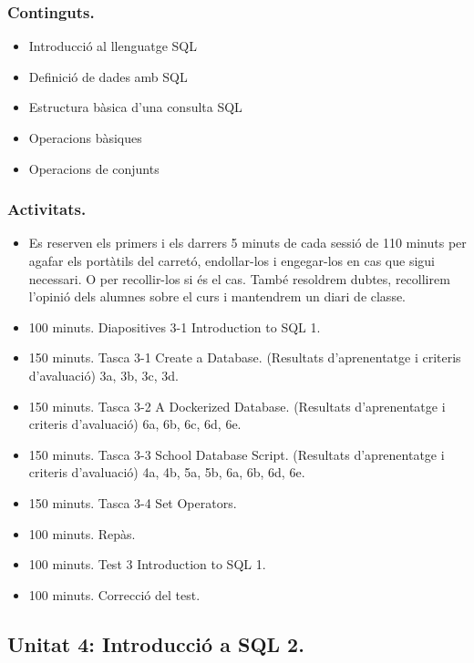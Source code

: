 \documentclass[catalan, a4paper, 12pt, titlepage]{article}
\begin{document}
  \subsubsection{Continguts.}
  \begin{itemize}
	  \item Introducció al llenguatge SQL
	  \item Definició de dades amb SQL
	  \item Estructura bàsica d'una consulta SQL
	  \item Operacions bàsiques
	  \item Operacions de conjunts
  \end{itemize}

  \subsubsection{Activitats.}

  \begin{itemize}
          \item Es reserven els primers i els darrers 5 minuts de cada sessió de 110 minuts per agafar els portàtils del carretó, endollar-los i engegar-los en cas que sigui necessari. O per recollir-los si és el cas. També resoldrem dubtes, recollirem l'opinió dels alumnes sobre el curs i mantendrem un diari de classe.
	  \item 100 minuts. Diapositives 3-1 Introduction to SQL 1.
	  \item 150 minuts. Tasca 3-1 Create a Database. (\faGraduationCap Resultats d'aprenentatge i criteris d'avaluació) 3a, 3b, 3c, 3d.
	  \item 150 minuts. Tasca 3-2 A Dockerized Database. (\faGraduationCap Resultats d'aprenentatge i criteris d'avaluació) 6a, 6b, 6c, 6d, 6e.
	  \item 150 minuts. Tasca 3-3 School Database Script. (\faGraduationCap Resultats d'aprenentatge i criteris d'avaluació) 4a, 4b, 5a, 5b, 6a, 6b, 6d, 6e.
	  \item 150 minuts. Tasca 3-4 Set Operators.
	  \item 100 minuts. Repàs.
	  \item 100 minuts. Test 3 Introduction to SQL 1.
	  \item 100 minuts. Correcció del test.
  \end{itemize}

  \subsection{Unitat 4: Introducció a SQL 2.}
\end{document}
